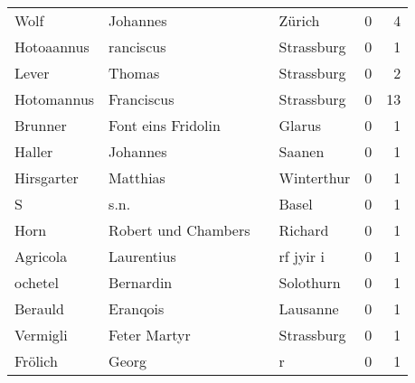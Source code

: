 \begin{tabular}{llllrr}
                     Wolf &                           Johannes &             &                                      Zürich &          0 &         4 \\
               Hotoaannus &                          ranciscus &             &                                  Strassburg &          0 &         1 \\
                    Lever &                             Thomas &             &                                  Strassburg &          0 &         2 \\
               Hotomannus &                         Franciscus &             &                                  Strassburg &          0 &        13 \\
                  Brunner &                 Font eins Fridolin &             &                                      Glarus &          0 &         1 \\
                   Haller &                           Johannes &             &                                      Saanen &          0 &         1 \\
               Hirsgarter &                           Matthias &             &                                  Winterthur &          0 &         1 \\
                        S &                               s.n. &             &                                       Basel &          0 &         1 \\
                     Horn &                Robert und Chambers &             &                                     Richard &          0 &         1 \\
                 Agricola &                         Laurentius &             &                                   rf jyir i &          0 &         1 \\
                  ochetel &                          Bernardin &             &                                   Solothurn &          0 &         1 \\
                  Berauld &                           Eranqois &             &                                    Lausanne &          0 &         1 \\
                 Vermigli &                       Feter Martyr &             &                                  Strassburg &          0 &         1 \\
                  Frölich &                              Georg &             &                                           r &          0 &         1 \\

\end{tabular}
